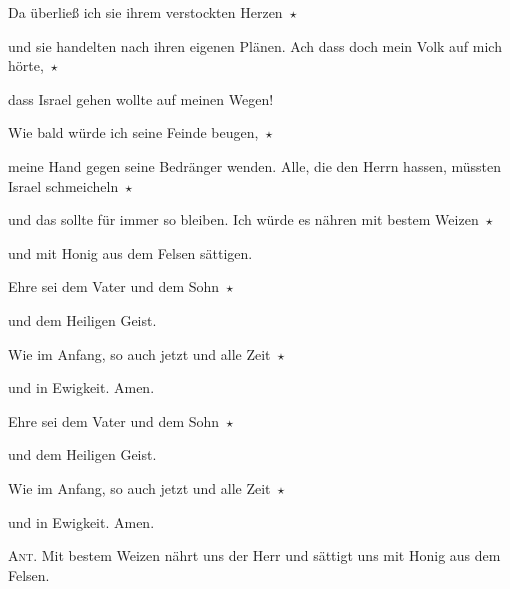 \noindent Da überließ ich sie ihrem verstockten Herzen~$\star$~\nopagebreak

und sie handelten nach ihren eigenen Plänen. Ach dass doch mein Volk auf mich hörte,~$\star$~\nopagebreak

dass Israel gehen wollte auf meinen Wegen!

\noindent Wie bald würde ich seine Feinde beugen,~$\star$~\nopagebreak

meine Hand gegen seine Bedränger wenden. Alle, die den Herrn hassen, müssten Israel schmeicheln~$\star$~\nopagebreak

und das sollte für immer so bleiben. Ich würde es nähren mit bestem Weizen~$\star$~\nopagebreak

und mit Honig aus dem Felsen sättigen.

\noindent Ehre sei dem Vater und dem Sohn~$\star$~\nopagebreak

und dem Heiligen Geist.

\noindent Wie im Anfang, so auch jetzt und alle Zeit~$\star$~\nopagebreak

und in Ewigkeit. Amen.

\noindent Ehre sei dem Vater und dem Sohn~$\star$~\nopagebreak

und dem Heiligen Geist.

\noindent Wie im Anfang, so auch jetzt und alle Zeit~$\star$~\nopagebreak

und in Ewigkeit. Amen.

\vspace{10pt}

\noindent \textsc{Ant.} Mit bestem Weizen nährt uns der Herr und sättigt uns mit Honig aus dem Felsen.